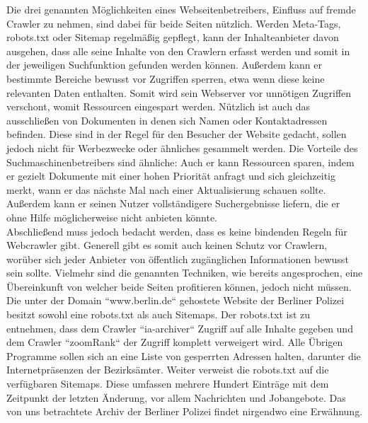 Die drei genannten Möglichkeiten eines Webseitenbetreibers, Einfluss auf fremde Crawler zu nehmen, sind dabei für beide Seiten nützlich. Werden Meta-Tags, robots.txt oder Sitemap regelmäßig gepflegt, kann der Inhalteanbieter davon ausgehen, dass alle seine Inhalte von den Crawlern erfasst werden und somit in der jeweiligen Suchfunktion gefunden werden können. Außerdem kann er bestimmte Bereiche bewusst vor Zugriffen sperren, etwa wenn diese keine relevanten Daten enthalten. Somit wird sein Webserver vor unnötigen Zugriffen verschont, womit Ressourcen eingespart werden. Nützlich ist auch das ausschließen von Dokumenten in denen sich Namen oder Kontaktadressen befinden. Diese sind in der Regel für den Besucher der Website gedacht, sollen jedoch nicht für Werbezwecke oder ähnliches gesammelt werden. Die Vorteile des Suchmaschinenbetreibers sind ähnliche: Auch er kann Ressourcen sparen, indem er gezielt Dokumente mit einer hohen Priorität anfragt und sich gleichzeitig merkt, wann er das nächste Mal nach einer Aktualisierung schauen sollte. Außerdem kann er seinen Nutzer vollständigere Suchergebnisse liefern, die er ohne Hilfe möglicherweise nicht anbieten könnte. \cite{suchmverst}\\
Abschließend muss jedoch bedacht werden, dass es keine bindenden Regeln für Webcrawler gibt. Generell gibt es somit auch keinen Schutz vor Crawlern, worüber sich jeder Anbieter von öffentlich zugänglichen Informationen bewusst sein sollte. Vielmehr sind die genannten Techniken, wie bereits angesprochen, eine Übereinkunft von welcher beide Seiten profitieren können, jedoch nicht müssen.\\
Die unter der Domain ``www.berlin.de`` gehostete Website der Berliner Polizei besitzt sowohl eine robots.txt als auch Sitemaps. Der robots.txt ist zu entnehmen, dass dem Crawler ``ia-archiver`` Zugriff auf alle Inhalte gegeben und dem Crawler ``zoomRank`` der Zugriff komplett verweigert wird. Alle Übrigen Programme sollen sich an eine Liste von gesperrten Adressen halten, darunter die Internetpräsenzen der Bezirksämter. Weiter verweist die robots.txt auf die verfügbaren Sitemaps. Diese umfassen mehrere Hundert Einträge mit dem Zeitpunkt der letzten Änderung, vor allem Nachrichten und Jobangebote. Das von uns betrachtete Archiv der Berliner Polizei findet nirgendwo eine Erwähnung. \cite{berlinrobots} \cite{berlinsitemap}

